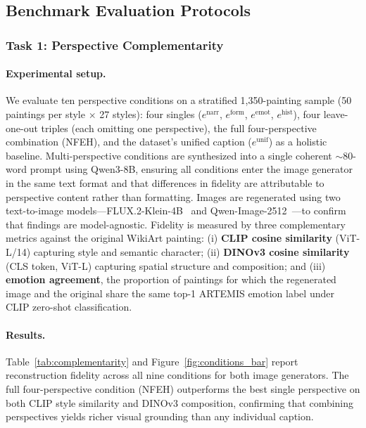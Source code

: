 \subsection{Benchmark Evaluation Protocols}

\subsubsection{Task 1: Perspective Complementarity}
\label{sec:complementarity}

\paragraph{Experimental setup.}
We evaluate ten perspective conditions on a stratified 1,350-painting sample (50 paintings per style $\times$ 27 styles): four singles ($e^{\text{narr}}$, $e^{\text{form}}$, $e^{\text{emot}}$, $e^{\text{hist}}$), four leave-one-out triples (each omitting one perspective), the full four-perspective combination (NFEH), and the dataset's unified caption ($e^{\text{unif}}$) as a holistic baseline.
Multi-perspective conditions are synthesized into a single coherent $\sim$80-word prompt using Qwen3-8B, ensuring all conditions enter the image generator in the same text format and that differences in fidelity are attributable to perspective content rather than formatting.
Images are regenerated using two text-to-image models---FLUX.2-Klein-4B~\cite{flux2} and Qwen-Image-2512~\cite{qwenimage}---to confirm that findings are model-agnostic.
Fidelity is measured by three complementary metrics against the original WikiArt painting: (i) \textbf{CLIP cosine similarity} (ViT-L/14) capturing style and semantic character; (ii) \textbf{DINOv3 cosine similarity} (CLS token, ViT-L) capturing spatial structure and composition; and (iii) \textbf{emotion agreement}, the proportion of paintings for which the regenerated image and the original share the same top-1 ARTEMIS emotion label under CLIP zero-shot classification.

\paragraph{Results.}
Table~\ref{tab:complementarity} and Figure~\ref{fig:conditions_bar} report reconstruction fidelity across all nine conditions for both image generators.
The full four-perspective condition (NFEH) outperforms the best single perspective on both CLIP style similarity and DINOv3 composition, confirming that combining perspectives yields richer visual grounding than any individual caption.

